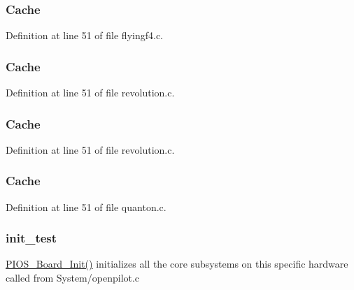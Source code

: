 \hypertarget{group___open_pilot_core_gaef8c3e152589675df7f5b49cc1ba7ffd}{
\subsubsection[{Cache}]{ Cache}}\label{group___open_pilot_core_gaef8c3e152589675df7f5b49cc1ba7ffd}


Definition at line 51 of file flyingf4.\-c.

\hypertarget{group___open_pilot_core_gaef8c3e152589675df7f5b49cc1ba7ffd}{
\subsubsection[{Cache}]{ Cache}}\label{group___open_pilot_core_gaef8c3e152589675df7f5b49cc1ba7ffd}


Definition at line 51 of file revolution.\-c.

\hypertarget{group___open_pilot_core_gaef8c3e152589675df7f5b49cc1ba7ffd}{
\subsubsection[{Cache}]{ Cache}}\label{group___open_pilot_core_gaef8c3e152589675df7f5b49cc1ba7ffd}


Definition at line 51 of file revolution.\-c.

\hypertarget{group___open_pilot_core_gaef8c3e152589675df7f5b49cc1ba7ffd}{
\subsubsection[{Cache}]{ Cache}}\label{group___open_pilot_core_gaef8c3e152589675df7f5b49cc1ba7ffd}


Definition at line 51 of file quanton.\-c.

\hypertarget{group___open_pilot_core_ga3ae7a284153c846031abf3ab8b2784c0}{
\subsubsection[{init\-\_\-test}]{ init\-\_\-test}}\label{group___open_pilot_core_ga3ae7a284153c846031abf3ab8b2784c0}
\hyperlink{group___open_pilot_b_l_ga902009c5b1cb57d9f9d60092eb7cacfb}{P\-I\-O\-S\-\_\-\-Board\-\_\-\-Init()} initializes all the core subsystems on this specific hardware called from System/openpilot.\-c 

